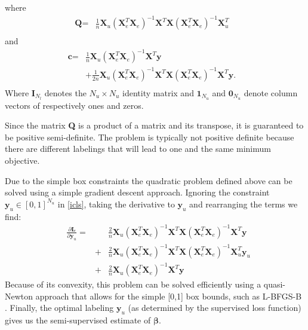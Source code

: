 \documentclass{elsarticle}
\newcommand{\Xe}{\mathbf{X}_e  }
\newcommand{\G}{\left(\Xe^T \Xe \right)^{-1}}
\begin{document}
where
\begin{equation}
\begin{aligned}
\textbf{Q} = & \frac{1}{n}  \textbf{X}_u \G \textbf{X}^T \textbf{X} \G \textbf{X}_u^T &\\
\end{aligned} \nonumber
\end{equation}
and
\begin{equation}
\begin{aligned}
\textbf{c} = & \frac{1}{n}  \textbf{X}_u \G \textbf{X}^T  \textbf{y} & \\
& + \frac{1}{2 n} \textbf{X}_u \G \textbf{X}^T \textbf{X} \G \textbf{X}^T \textbf{y}. &\\
\end{aligned} \nonumber
\end{equation}
Where $\textbf{I}_{N_l}$ denotes the $N_u \times N_u$ identity matrix and $\textbf{1}_{N_u}$ and $\textbf{0}_{N_u}$ denote column vectors of respectively ones and zeros.

Since the matrix \textbf{Q} is a product of a matrix and its transpose, it is guaranteed to be positive semi-definite. The problem is typically not positive definite because there are different labelings that will lead to one and the same minimum objective. 

Due to the simple box constraints the quadratic problem defined above can be solved using a simple gradient descent approach. Ignoring the constraint $\textbf{y}_u \in [0,1]^{N_u}$ in \eqref{icls}, taking the derivative to $\textbf{y}_u$ and rearranging the terms we find: 
\begin{equation}
\begin{aligned}
&\frac { \partial \textbf{L} }{ \partial \textbf{y}_u } = & & \frac{2}{n}  \textbf{X}_u \G \textbf{X}^T \textbf{X} \G \textbf{X}^T \textbf{y}  \\
& & + & \frac{2}{n}  \textbf{X}_u \G \textbf{X}^T  \textbf{X}  \G  \textbf{X}_u^T \textbf{y}_u  \\
& & + & \frac{2}{n}  \textbf{X}_u \G \textbf{X}^T  \textbf{y}
\end{aligned}
\end{equation}
Because of its convexity, this problem can be solved efficiently using a quasi-Newton approach that allows for the simple [0,1] box bounds, such as L-BFGS-B \cite{Byrd1995}. Finally, the optimal labeling $\textbf{y}_u$ (as determined by the supervised loss function) gives us the semi-supervised estimate of $\boldsymbol{\beta}$.
\end{document}
